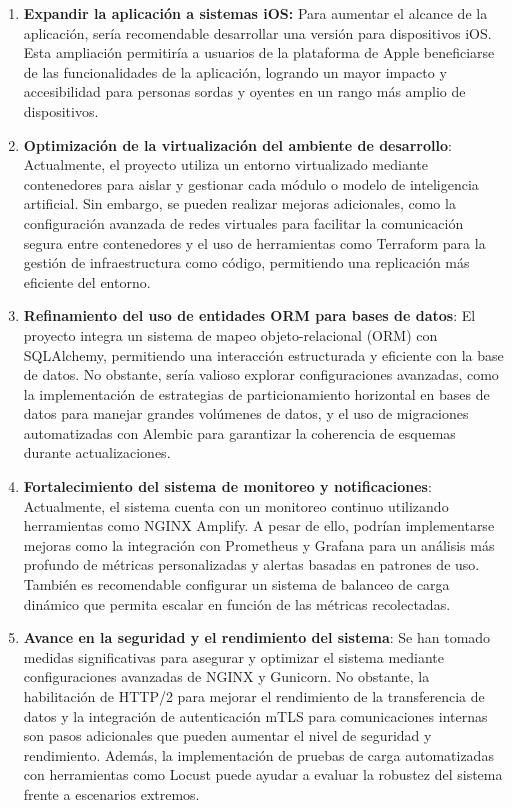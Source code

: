 \begin{enumerate}
    \item \textbf{Expandir la aplicación a sistemas iOS:} 
    Para aumentar el alcance de la aplicación, sería recomendable desarrollar una versión para dispositivos iOS. Esta ampliación permitiría a usuarios de la plataforma de Apple beneficiarse de las funcionalidades de la aplicación, logrando un mayor impacto y accesibilidad para personas sordas y oyentes en un rango más amplio de dispositivos.

    \item \textbf{Optimización de la virtualización del ambiente de desarrollo}: Actualmente, el proyecto utiliza un entorno virtualizado mediante contenedores para aislar y gestionar cada módulo o modelo de inteligencia artificial. Sin embargo, se pueden realizar mejoras adicionales, como la configuración avanzada de redes virtuales para facilitar la comunicación segura entre contenedores y el uso de herramientas como Terraform para la gestión de infraestructura como código, permitiendo una replicación más eficiente del entorno.

    \item \textbf{Refinamiento del uso de entidades ORM para bases de datos}: El proyecto integra un sistema de mapeo objeto-relacional (ORM) con SQLAlchemy, permitiendo una interacción estructurada y eficiente con la base de datos. No obstante, sería valioso explorar configuraciones avanzadas, como la implementación de estrategias de particionamiento horizontal en bases de datos para manejar grandes volúmenes de datos, y el uso de migraciones automatizadas con Alembic para garantizar la coherencia de esquemas durante actualizaciones.

    \item \textbf{Fortalecimiento del sistema de monitoreo y notificaciones}: Actualmente, el sistema cuenta con un monitoreo continuo utilizando herramientas como NGINX Amplify. A pesar de ello, podrían implementarse mejoras como la integración con Prometheus y Grafana para un análisis más profundo de métricas personalizadas y alertas basadas en patrones de uso. También es recomendable configurar un sistema de balanceo de carga dinámico que permita escalar en función de las métricas recolectadas.

    \item \textbf{Avance en la seguridad y el rendimiento del sistema}: Se han tomado medidas significativas para asegurar y optimizar el sistema mediante configuraciones avanzadas de NGINX y Gunicorn. No obstante, la habilitación de HTTP/2 para mejorar el rendimiento de la transferencia de datos y la integración de autenticación mTLS para comunicaciones internas son pasos adicionales que pueden aumentar el nivel de seguridad y rendimiento. Además, la implementación de pruebas de carga automatizadas con herramientas como Locust puede ayudar a evaluar la robustez del sistema frente a escenarios extremos.


\end{enumerate}
